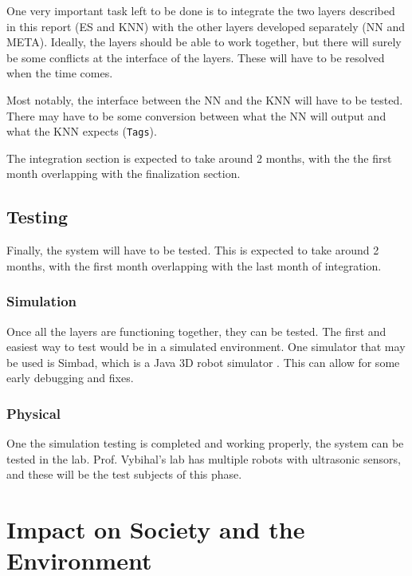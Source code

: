 \documentclass[titlepage,11pt]{article}
\newcommand{\code}[1]{\texttt{#1}}
\begin{document}
One very important task left to be done is to integrate the two layers described in this report (ES and KNN) with the other layers developed separately (NN and META). Ideally, the layers should be able to work together, but there will surely be some conflicts at the interface of the layers. These will have to be resolved when the time comes.

Most notably, the interface between the NN and the KNN will have to be tested. There may have to be some conversion between what the NN will output and what the KNN expects (\code{Tags}).

The integration section is expected to take around 2 months, with the the first month overlapping with the finalization section.

\subsection{Testing}

Finally, the system will have to be tested. This is expected to take around 2 months, with the first month overlapping with the last month of integration.

\subsubsection{Simulation}

Once all the layers are functioning together, they can be tested. The first and easiest way to test would be in a simulated environment. One simulator that may be used is Simbad, which is a Java 3D robot simulator \cite{simbad}. This can allow for some early debugging and fixes.

\subsubsection{Physical}

One the simulation testing is completed and working properly, the system can be tested in the lab. Prof. Vybihal's lab has multiple robots with ultrasonic sensors, and these will be the test subjects of this phase.

\section{Impact on Society and the Environment}
\end{document}
